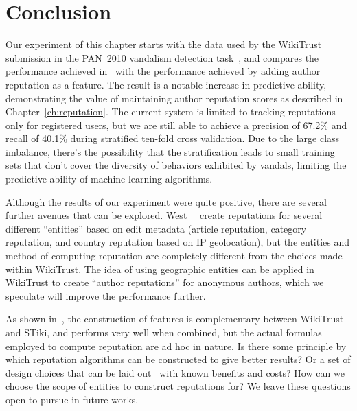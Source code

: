\section{Conclusion}

Our experiment of this chapter starts with the data used by the
WikiTrust submission in the PAN~2010 vandalism detection
task~\cite{Adler2010b}, and compares the performance achieved
in~\cite{Potthast2010b}
with the performance achieved by adding author reputation as a feature.
The result is a notable increase in predictive ability, demonstrating
the value of maintaining author reputation scores as described in
Chapter~\ref{ch:reputation}.
The current system is limited to tracking reputations only for
registered users, but we are still able to achieve a precision of 67.2\%
and recall of 40.1\% during stratified ten-fold cross validation.
Due to the large class imbalance, there's the possibility that the
stratification leads to small training sets that don't cover the
diversity of behaviors exhibited by vandals, limiting the predictive
ability of machine learning algorithms.

Although the results of our experiment were quite positive, there are
several further avenues that can be explored.
West~\etal~\cite{West2010} create reputations for several different
``entities'' based on edit metadata (\eg article reputation, category
reputation, and country reputation based on IP geolocation), but the
entities and method of computing reputation are completely different
from the choices made within WikiTrust.
The idea of using geographic entities can be applied in WikiTrust to
create ``author reputations'' for anonymous authors, which we speculate
will improve the performance further.

As shown in~\cite{Adler2011a}, the construction of features is complementary
between WikiTrust and STiki, and performs very well when combined, but the
actual formulas employed to compute reputation are ad hoc in nature.
Is there some principle by which reputation algorithms can be
constructed to give better results?
Or a set of design choices that can be laid out~\cite{Adler2011b} with
known benefits and costs?
How can we choose the scope of entities to construct reputations for?
We leave these questions open to pursue in future works.




